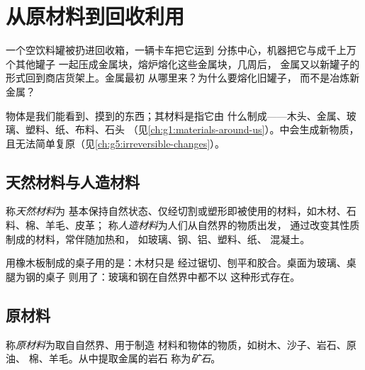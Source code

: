 \chapter{从原材料到回收利用}\label{ch:g5:raw-materials-and-recycling}

一个空饮料罐被扔进回收箱，一辆卡车把它运到
分拣中心，机器把它与成千上万个其他罐子
一起压成金属块，熔炉熔化这些金属块，几周后，
金属又以新罐子的形式回到商店货架上。金属最初
从哪里来？为什么要熔化旧罐子，
而不是冶炼新金属？

\begin{recall}
物体是我们能看到、摸到的东西；其材料是指它由
什么制成——木头、金属、玻璃、塑料、纸、布料、石头
（见\cref{ch:g1:materials-around-us}）。中会生成新物质，
且无法简单复原（见\cref{ch:g5:irreversible-changes}）。
\end{recall}

\section{天然材料与人造材料}

\begin{definition}[天然材料与人造材料]\label{def:g5:raw-materials-and-recycling:natural-material}
称\emph{天然材料}为
基本保持自然状态、仅经切割或塑形即被使用的材料，如木材、石料、棉、羊毛、皮革；
称\emph{人造材料}为人们从自然界的物质出发，
通过改变其性质制成的材料，常伴随加热和，
如玻璃、钢、铝、塑料、纸、
混凝土。
\end{definition}

\begin{example}[两张桌子]\label{ex:g5:raw-materials-and-recycling:tables}
用橡木板制成的桌子用的是：木材只是
经过锯切、刨平和胶合。桌面为玻璃、桌腿为钢的桌子
则用了：玻璃和钢在自然界中都不以
这种形式存在。
\end{example}

\section{原材料}

\begin{definition}[原材料与矿石]\label{def:g5:raw-materials-and-recycling:raw-material}
称\emph{原材料}为取自自然界、用于制造
材料和物体的物质，如树木、沙子、岩石、原油、
棉、羊毛。从中提取金属的岩石
称为\emph{矿石}。
\end{definition}

